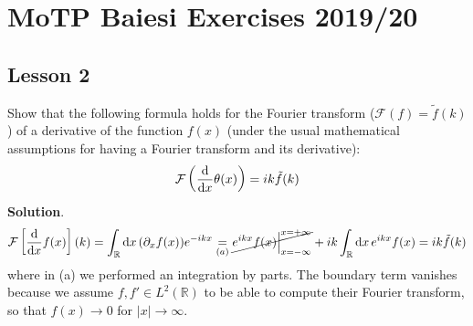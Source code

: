 \documentclass[../template.tex]{subfiles}
\begin{document}
\chapter{MoTP Baiesi Exercises 2019/20}

\section{Lesson 2}
\begin{exo}
    Show that the following formula holds for the Fourier transform ($\mathcal{F}(f) = \tilde{f}(k)$) of a derivative of the function $f(x)$ (under the usual mathematical assumptions for having a Fourier transform and its derivative):
    \begin{align*}
        \mathcal{F}\left(\dv{x} \theta(x)\right) = i k \tilde{f}(k)
    \end{align*}
    \medskip
    \textbf{Solution}. 
    \begin{align*}
        \mathcal{F}\left[\dv{x} f(x)\right](k) = \int_{\mathbb{R}} \dd{x} (\partial_x f(x)) e^{-ikx} \underset{(a)}{=} \cancel{e^{ikx} f(x) \Big|_{x=-\infty}^{x=+\infty} }+ ik \int_{\mathbb{R}} \dd{x} e^{ikx} f(x) = ik\tilde{f}(k)
    \end{align*}
    where in (a) we performed an integration by parts. The boundary term vanishes because we assume $f, f' \in L^2(\mathbb{R})$ to be able to compute their Fourier transform, so that $f(x) \to 0$ for $|x| \to \infty$.
\end{exo}
\end{document}
